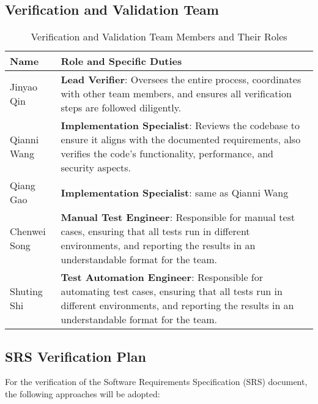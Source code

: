 \documentclass[12pt, titlepage]{article}
\begin{document}
\subsection{Verification and Validation Team}
     \begin{table}[H]
     \centering
     \begin{tabular}{l p{10cm}}
          \toprule
          \textbf{Name} & \textbf{Role and Specific Duties}\\
          \midrule
          Jinyao Qin & \textbf{Lead Verifier}: Oversees the entire process, coordinates with other team members, and ensures all verification steps are followed diligently.\\
          
          Qianni Wang & \textbf{Implementation Specialist}: Reviews the codebase to ensure it aligns with the documented requirements, also verifies the code's functionality, performance, and security aspects.\\
          
          Qiang Gao & \textbf{Implementation Specialist}: same as Qianni Wang\\
          
          Chenwei Song & \textbf{Manual Test Engineer}: Responsible for manual test cases, ensuring that all tests run in different environments, and reporting the results in an understandable format for the team.\\
          
          Shuting Shi & \textbf{Test Automation Engineer}: Responsible for automating test cases, ensuring that all tests run in different environments, and reporting the results in an understandable format for the team.\\
          \bottomrule
        \end{tabular}
     \caption{Verification and Validation Team Members and Their Roles}
     \end{table}

\subsection{SRS Verification Plan}

For the verification of the Software Requirements Specification (SRS) document, the following approaches will be adopted:
\end{document}
